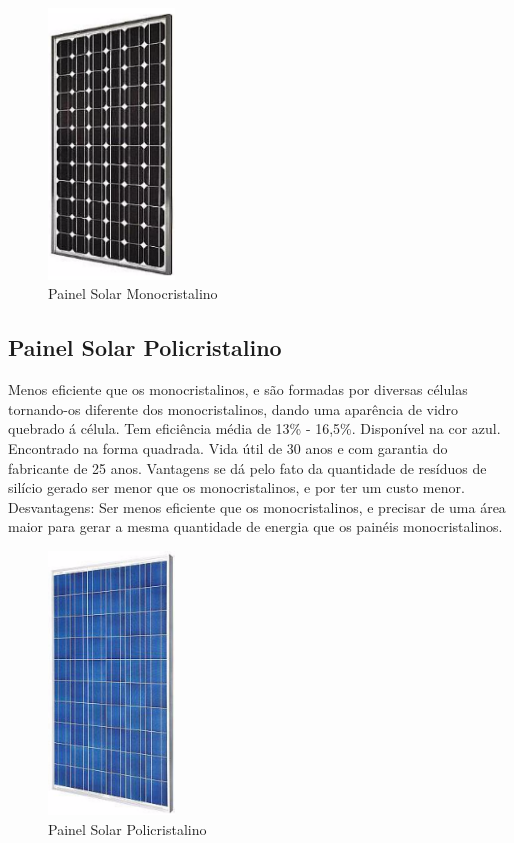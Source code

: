 \begin{figure}[!h]
\centering
\includegraphics[width=0.3\textwidth]{figuras/placa.png}
\caption{Painel Solar Monocristalino}
\label{fig:placa}
\end{figure}

\subsection{Painel Solar Policristalino}

Menos eficiente que os monocristalinos, e são formadas por diversas células tornando-os diferente dos monocristalinos, dando uma aparência de vidro quebrado á célula. Tem eficiência média de 13\% - 16,5\%. Disponível na cor azul. Encontrado na forma quadrada. Vida útil de 30 anos e com garantia do fabricante de 25 anos. Vantagens se dá pelo fato da quantidade de resíduos de silício gerado ser menor que os monocristalinos, e por ter um custo menor. Desvantagens: Ser menos eficiente que os monocristalinos, e precisar de uma área maior para gerar a mesma quantidade de energia que os painéis monocristalinos.

\begin{figure}[!h]
\centering
\includegraphics[width=0.3\textwidth]{figuras/painel.png}
\caption{Painel Solar Policristalino}
\label{fig:painel}
\end{figure}

